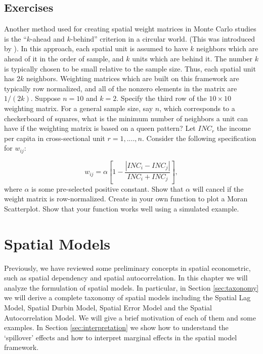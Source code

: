 \documentclass[english,12pt]{book}\usepackage[]{graphicx}\usepackage[]{xcolor}
\begin{document}
\section{Exercises}

\begin{exercises}
 \exercise Another method used for creating spatial weight matrices in Monte Carlo studies is the ``$k$-ahead and $k$-behind'' criterion in a circular world. (This was introduced by \cite{kelejian1999generalized}). In this approach, each spatial unit is assumed to have $k$ neighbors which are ahead of it in the order of sample, and $k$ units which are behind it. The number $k$ is typically chosen to be small relative to the sample size. Thus, each spatial unit has $2k$ neighbors. Weighting matrices which are built on this framework are typically row normalized, and all of the nonzero elements in the matrix are $1/(2k)$. Suppose $n =10$ and $k =2$. Specify the third row of the $10\times 10$ weighting matrix.
 \exercise For a general sample size, say $n$, which corresponds to a checkerboard of squares, what is the minimum number of neighbors a unit can have if the weighting matrix is based on a queen pattern?
 \exercise  Let $INC_r$ the income per capita in cross-sectional unit $r = 1, ...., n$. Consider the following specification for $w_{ij}$:
	
	\begin{equation*}
	w_{ij}= \alpha\left[1 - \frac{\left|INC_i - INC_j\right|}{INC_i+ INC_j}\right], 
	\end{equation*}
	where $\alpha$ is some pre-selected positive constant. Show that $\alpha$ will cancel if the weight matrix is row-normalized.
	\exercise  Create in  your own function to plot a Moran Scatterplot. Show that your function works well using a simulated example. 
\end{exercises}


\chapter{Spatial Models}

Previously, we have reviewed some preliminary concepts in spatial econometric, such as spatial dependency and spatial autocorrelation. In this chapter we will analyze the formulation of spatial models. In particular, in Section \ref{sec:taxonomy} we will derive a complete taxonomy of spatial models including the Spatial Lag Model, Spatial Durbin Model, Spatial Error Model and the Spatial Autocorrelation Model. We will give a brief motivation of each of them and some examples.  In Section \ref{sec:interpretation} we show how to understand the `spillover' effects and how to interpret marginal effects in the spatial model framework. 
\end{document}
